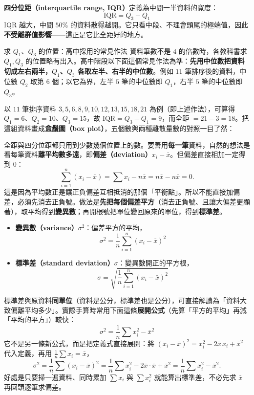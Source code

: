 \documentclass[11pt]{article}
\begin{document}
\textbf{四分位距（interquartile range, IQR）}定義為中間一半資料的寬度：
$$\boxed{\;\text{IQR} = Q_3 - Q_1\;}$$
IQR 越大，中間 $50\%$ 的資料散得越開。它只看中段、不理會頭尾的極端值，因此\textbf{不受離群值影響}——這正是它比全距好的地方。

\begin{補充框}{求 $Q_1$、$Q_3$ 的位置：高中採用的常見作法}
資料筆數不是 $4$ 的倍數時，各教科書求 $Q_1,Q_3$ 的位置略有出入。高中階段以下面這個常見作法為準：\textbf{先用中位數把資料切成左右兩半，$Q_1$、$Q_3$ 各取左半、右半的中位數}。例如 $11$ 筆排序後的資料，中位數 $Q_2$ 取第 $6$ 個；以它為界，左半 $5$ 筆的中位數即 $Q_1$，右半 $5$ 筆的中位數即 $Q_3$。
\end{補充框}

以 $11$ 筆排序資料 $3,5,6,8,9,10,12,13,15,18,21$ 為例（即上述作法），可算得 $Q_1=6$、$Q_2=10$、$Q_3=15$，故 $\text{IQR}=Q_3-Q_1=9$，而全距 $=21-3=18$。把這組資料畫成\textbf{盒鬚圖（box plot）}，五個數與兩種離散量數的對照一目了然：


全距與四分位距都只用到少數幾個位置上的數。要善用\textbf{每一筆}資料，自然的想法是看每筆資料\textbf{離平均數多遠}，即\textbf{偏差（deviation）}$x_i - \bar{x}$。但偏差直接相加一定得到 $0$：
$$\sum_{i=1}^{n}(x_i - \bar{x}) = \sum x_i - n\bar{x} = n\bar{x} - n\bar{x} = 0.$$
這是因為平均數正是讓正負偏差互相抵消的那個「平衡點」。所以不能直接加偏差，必須先消去正負號。做法是\textbf{先把每個偏差平方}（消去正負號、且讓大偏差更顯著），取平均得到\textbf{變異數}；再開根號把單位變回原來的單位，得到\textbf{標準差}。

\begin{itemize}\setlength{\itemsep}{3pt}
\item \textbf{變異數（variance）}$\sigma^2$：偏差平方的平均，
$$\boxed{\;\sigma^2 = \frac{1}{n}\sum_{i=1}^{n}(x_i - \bar{x})^2\;}$$
\item \textbf{標準差（standard deviation）}$\sigma$：變異數開正的平方根，
$$\boxed{\;\sigma = \sqrt{\frac{1}{n}\sum_{i=1}^{n}(x_i - \bar{x})^2}\;}$$
\end{itemize}

標準差與原資料\textbf{同單位}（資料是公分，標準差也是公分），可直接解讀為「資料大致偏離平均多少」。實際手算時常用下面這條\textbf{展開公式}（先算「平方的平均」再減「平均的平方」）較快：
$$\boxed{\;\sigma^2 = \frac{1}{n}\sum x_i^2 - \bar{x}^2\;}$$
它不是另一條新公式，而是把定義式直接展開：將 $(x_i-\bar x)^2 = x_i^2 - 2\bar x\,x_i + \bar x^2$ 代入定義，再用 $\frac1n\sum x_i = \bar x$，
$$\sigma^2 = \frac1n\sum (x_i-\bar x)^2 = \frac1n\sum x_i^2 - 2\bar x\cdot\bar x + \bar x^2 = \frac1n\sum x_i^2 - \bar x^2.$$
好處是只要掃一遍資料、同時累加 $\sum x_i$ 與 $\sum x_i^2$ 就能算出標準差，不必先求 $\bar x$ 再回頭逐筆求偏差。
\end{document}
